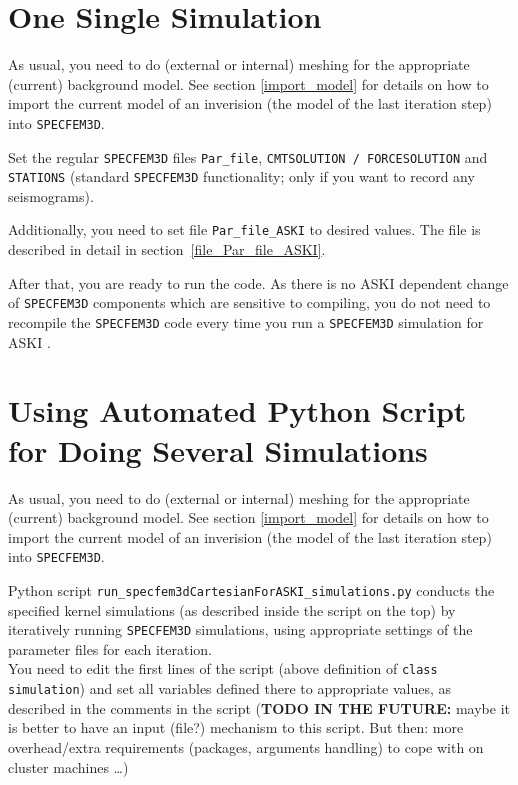 \documentclass[12pt,a4paper]{article}
\newcommand{\lcode}[1]{\nolinkurl{#1}}
\newcommand{\ASKI}{ {\ttfamily ASKI} }
\begin{document}
\section{One Single Simulation} \label{no_script}
%
As usual, you need to do (external or internal) meshing for the appropriate (current) background model. 
See section \ref{import_model} for details on how to import the current model of an inverision (the model of the last
iteration step) into \lcode{SPECFEM3D}.

Set the regular \lcode{SPECFEM3D} files \lcode{Par_file}, \lcode{CMTSOLUTION / FORCESOLUTION} 
and \lcode{STATIONS} (standard \lcode{SPECFEM3D} functionality; only if you want to record any seismograms).

Additionally, you need to set file \lcode{Par_file_ASKI} to desired values. The file is described 
in detail in section~\ref{file_Par_file_ASKI}. 

After that, you are ready to run the code. As there is no \ASKI dependent change of \lcode{SPECFEM3D} 
components which are sensitive to compiling, you do not need to recompile the \lcode{SPECFEM3D} code every time you
run a \lcode{SPECFEM3D} simulation for \ASKI.
%
\section{Using Automated Python Script for Doing Several Simulations} \label{use_script}
%
As usual, you need to do (external or internal) meshing for the appropriate (current) background model. 
See section \ref{import_model} for details on how to import the current model of an inverision (the model of the last
iteration step) into \lcode{SPECFEM3D}.

Python script \lcode{run_specfem3dCartesianForASKI_simulations.py} conducts the specified 
kernel simulations (as described inside the script on the top) by iteratively running 
\lcode{SPECFEM3D} simulations, using appropriate settings of the parameter files for each iteration. \\
You need to edit the first lines of the script (above definition of \lcode{class simulation}) and set 
all variables defined there to appropriate values, as described in the comments in the script 
({\bf TODO IN THE FUTURE:} maybe it is better to have an input (file?) mechanism to this script. But then: more
overhead/extra requirements (packages, arguments handling) to cope with on cluster machines \dots)
\end{document}
